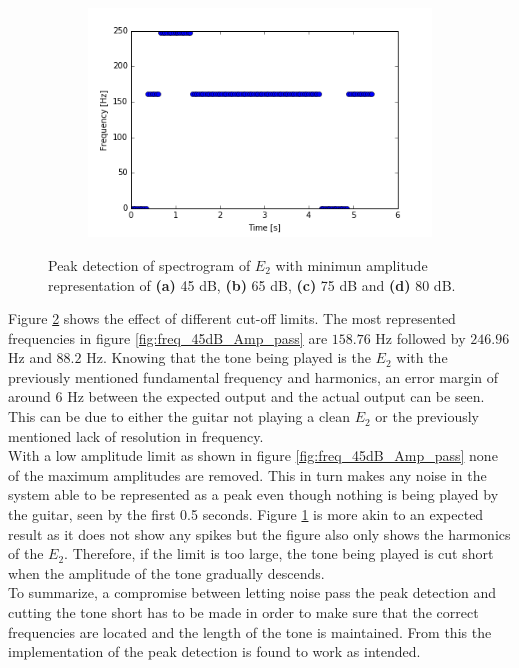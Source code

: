 \begin{figure}[H]
\begin{subfigure}{0.49\textwidth}
\includegraphics[width=\textwidth]{figures/peak_detection/peak_lim4.png}
\caption{}
\label{fig:freq_80dB_Amp_pass}

\end{subfigure}
\caption{Peak detection of spectrogram of $E_2$ with minimun amplitude representation of \textbf{(a)} 45 dB, \textbf{(b)} 65 dB, \textbf{(c)} 75 dB and \textbf{(d)} 80 dB.}
\label{fig:valdation_peak_detection}
\end{figure}
Figure \ref{fig:valdation_peak_detection} shows the effect of different cut-off limits. The most represented frequencies in figure \ref{fig:freq_45dB_Amp_pass} are $158.76$ Hz followed by $246.96$ Hz and $88.2$ Hz. 
Knowing that the tone being played is the $E_2$ with the previously mentioned fundamental frequency and harmonics, an error margin of around $6$ Hz between the expected output and the actual output can be seen. This can be due to either the guitar not playing a clean $E_2$ or the previously mentioned lack of resolution in frequency.
\\
With a low amplitude limit as shown in figure \ref{fig:freq_45dB_Amp_pass} none of the maximum amplitudes are removed. This in turn makes any noise in the system able to be represented as a peak even though nothing is being played by the guitar, seen by the first 0.5 seconds.
Figure \ref{fig:freq_80dB_Amp_pass} is more akin to an expected result as it does not show any spikes but the figure also only shows the harmonics of the $E_2$. Therefore, if the limit is too large, the tone being played is cut short when the amplitude of the tone gradually descends.
\\
To summarize, a compromise between letting noise pass the peak detection and cutting the tone short has to be made in order to make sure that the correct frequencies are located and the length of the tone is maintained. From this the implementation of the peak detection is found to work as intended.